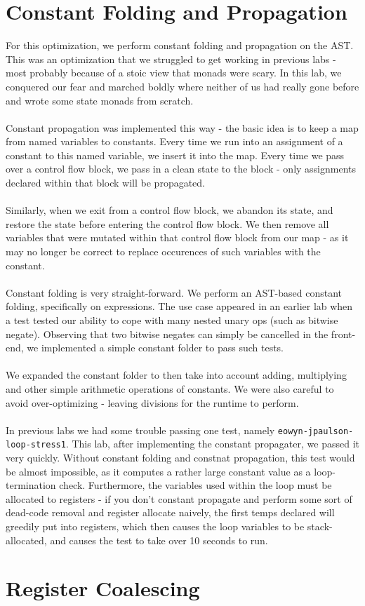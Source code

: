\documentclass[11pt]{article}
\begin{document}
\section{Constant Folding and Propagation}
For this optimization, we perform constant folding and propagation on the AST. This
was an optimization that we struggled to get working in previous labs - most probably because
of a stoic view that monads were scary. In this lab, we conquered our fear and marched boldly
where neither of us had really gone before and wrote some state monads from scratch. \\
\\
Constant propagation was implemented this way - the basic idea is to keep a map from named
variables to constants. Every time we run into an assignment of a constant to this named
variable, we insert it into the map. Every time we pass over a control flow block, we pass
in a clean state to the block - only assignments declared within that block will be propagated. \\
\\
Similarly, when we exit from a control flow block, we abandon its state, and restore the state
before entering the control flow block. We then remove all variables that were mutated within that
control flow block from our map - as it may no longer be correct to replace occurences of such
variables with the constant. \\
\\
Constant folding is very straight-forward. We perform an AST-based constant folding, specifically
on expressions. The use case appeared in an earlier lab when a test tested our ability to cope with
many nested unary ops (such as bitwise negate). Observing that two bitwise negates can simply be
cancelled in the front-end, we implemented a simple constant folder to pass such tests. \\
\\
We expanded the constant folder to then take into account adding, multiplying and other simple
arithmetic operations of constants. We were also careful to avoid over-optimizing - leaving
divisions for the runtime to perform.\\
\\
In previous labs we had some trouble passing one test, namely \verb+eowyn-jpaulson-loop-stress1+.
This lab, after implementing the constant propagater, we passed it very quickly. Without
constant folding and constnat propagation, this test would be almost impossible, as it computes
a rather large constant value as a loop-termination check. Furthermore, the variables used
within the loop must be allocated to registers - if you don't constant propagate and perform
some sort of dead-code removal and register allocate naively, the first temps declared will
greedily put into registers, which then causes the loop variables to be stack-allocated,
and causes the test to take over 10 seconds to run.

\section{Register Coalescing}
\end{document}
